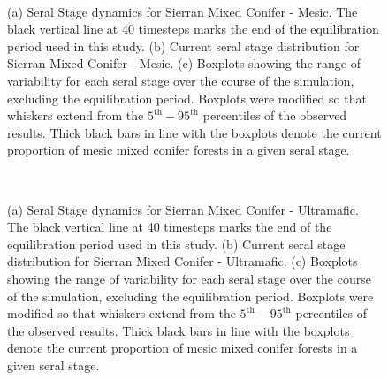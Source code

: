 \begin{figure}[!htbp]
  \centering
  \\
  \caption{(a) Seral Stage dynamics for Sierran Mixed Conifer - Mesic. The black vertical line at 40 timesteps marks the end of the equilibration period used in this study. (b) Current seral stage distribution for Sierran Mixed Conifer - Mesic. (c) Boxplots showing the range of variability for each seral stage over the course of the simulation, excluding the equilibration period. Boxplots were modified so that whiskers extend from the $5^{\text{th}} - 95^{\text{th}}$ percentiles of the observed results. Thick black bars in line with the boxplots denote the current proportion of mesic mixed conifer forests in a given seral stage.} 
  \label{fig:covcond_smcm_app}
\end{figure}


\begin{figure}[!htbp]
  \centering
  \\
  \caption{(a) Seral Stage dynamics for Sierran Mixed Conifer - Ultramafic. The black vertical line at 40 timesteps marks the end of the equilibration period used in this study. (b) Current seral stage distribution for Sierran Mixed Conifer - Ultramafic. (c) Boxplots showing the range of variability for each seral stage over the course of the simulation, excluding the equilibration period. Boxplots were modified so that whiskers extend from the $5^{\text{th}} - 95^{\text{th}}$ percentiles of the observed results. Thick black bars in line with the boxplots denote the current proportion of mesic mixed conifer forests in a given seral stage.} 
  \label{fig:covcond_smcu}
\end{figure}

